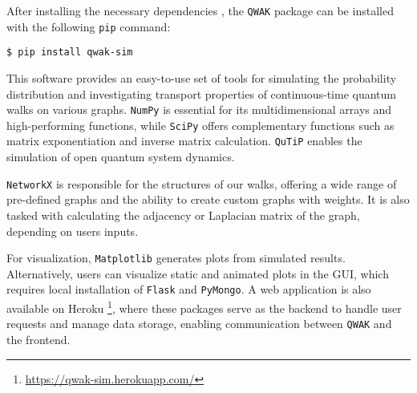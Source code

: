 \documentclass[main.tex]{subfiles}
\begin{document}
After installing the necessary dependencies , the \texttt{QWAK} package can be
installed with the following \texttt{pip} command:

\begin{lstlisting}[style=commands]
$ pip install qwak-sim
\end{lstlisting}

This software provides an easy-to-use set of tools for simulating the
probability distribution and investigating transport properties of
continuous-time quantum walks on various graphs. \texttt{NumPy} is essential
for its multidimensional arrays and high-performing functions, while
\texttt{SciPy} offers complementary functions such as matrix exponentiation and
inverse matrix calculation. \texttt{QuTiP} enables the simulation of open
quantum system dynamics.\par

\texttt{NetworkX} is responsible for the structures of our walks, offering a
wide range of pre-defined graphs and the ability to create custom graphs with
weights. It is also tasked with calculating the adjacency or Laplacian matrix
of the graph, depending on users inputs.\par 

For visualization, \texttt{Matplotlib} generates plots from simulated results.
Alternatively, users can visualize static and animated plots in the GUI, which
requires local installation of \texttt{Flask} and \texttt{PyMongo}. A web
application is also available on Heroku
\footnote{\url{https://qwak-sim.herokuapp.com/}}, where these packages serve as
the backend to handle user requests and manage data storage, enabling
communication between \texttt{QWAK} and the frontend.
\end{document}
